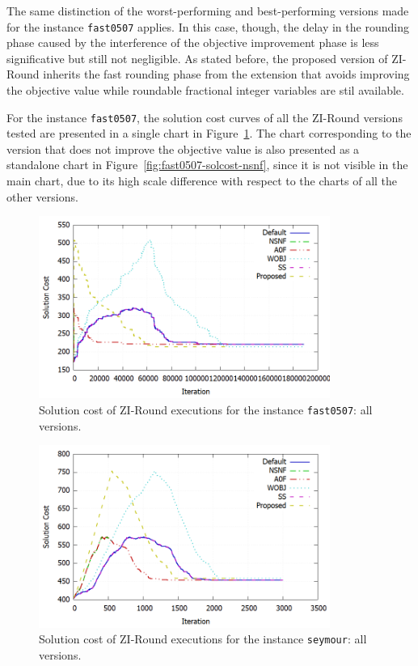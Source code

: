\documentclass[a4paper,12pt,twoside]{scrbook}
\begin{document}
The same distinction of the worst-performing and best-performing versions made for the instance \texttt{fast0507} applies. In this case, though, the delay in the rounding phase caused by the interference of the objective improvement phase is less significative but still not negligible. As stated before, the proposed version of ZI-Round inherits the fast rounding phase from the extension that avoids improving the objective value while roundable fractional integer variables are stil available. \par

For the instance \texttt{fast0507}, the solution cost curves of all the ZI-Round versions tested are presented in a single chart in Figure~\ref{fig:fast0507-solcost-all}. The chart corresponding to the version that does not improve the objective value is also presented as a standalone chart in Figure~\ref{fig:fast0507-solcost-nsnf}, since it is not visible in the main chart, due to its high scale difference with respect to the charts of all the other versions.

\begin{figure}[ht]
	\centering
	\includegraphics[width=0.85\textwidth]{fast0507-solcost-all.png}
	\caption{Solution cost of ZI-Round executions for the instance \texttt{fast0507}: all versions.}
	\label{fig:fast0507-solcost-all}
\end{figure}

\begin{figure}[h!]
	\centering
	\includegraphics[width=0.85\textwidth]{seymour-solcost-all.png}
	\caption{Solution cost of ZI-Round executions for the instance \texttt{seymour}: all versions.}
	\label{fig:seymour-solcost-all}
\end{figure}
\end{document}
